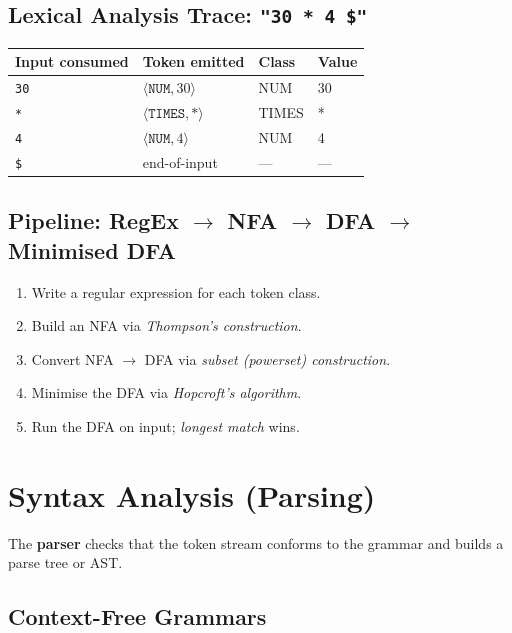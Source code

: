 \documentclass[12pt,a4paper]{article}
\begin{document}
\subsection{Lexical Analysis Trace: \texttt{"30 * 4 \$"}}

\begin{center}
\begin{tabular}{llll}
\toprule
Input consumed & Token emitted & Class & Value\\
\midrule
\texttt{30} & $\langle\mathtt{NUM}, 30\rangle$ & NUM & 30\\
\texttt{*}  & $\langle\mathtt{TIMES}, \text{*}\rangle$ & TIMES & *\\
\texttt{4}  & $\langle\mathtt{NUM}, 4\rangle$  & NUM & 4\\
\texttt{\$} & end-of-input                    & ---  & ---\\
\bottomrule
\end{tabular}
\end{center}

\subsection{Pipeline: RegEx $\to$ NFA $\to$ DFA $\to$ Minimised DFA}

\begin{enumerate}
  \item Write a regular expression for each token class.
  \item Build an NFA via \emph{Thompson's construction}.
  \item Convert NFA $\to$ DFA via \emph{subset (powerset) construction}.
  \item Minimise the DFA via \emph{Hopcroft's algorithm}.
  \item Run the DFA on input; \emph{longest match} wins.
\end{enumerate}

\section{Syntax Analysis (Parsing)}

The \textbf{parser} checks that the token stream conforms to the grammar and
builds a parse tree or AST.

\subsection{Context-Free Grammars}
\end{document}
